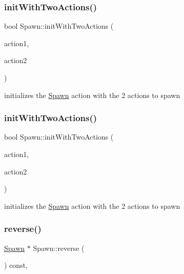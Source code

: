 \subsubsection{\texorpdfstring{init\+With\+Two\+Actions()}{initWithTwoActions()}\hspace{0.1cm}{\footnotesize\ttfamily [1/2]}}
{\footnotesize\ttfamily bool Spawn\+::init\+With\+Two\+Actions (\begin{DoxyParamCaption}\item[{\hyperlink{classFiniteTimeAction}{Finite\+Time\+Action} $\ast$}]{action1,  }\item[{\hyperlink{classFiniteTimeAction}{Finite\+Time\+Action} $\ast$}]{action2 }\end{DoxyParamCaption})}

initializes the \hyperlink{classSpawn}{Spawn} action with the 2 actions to spawn \mbox{\label{classSpawn_a7ca09352e8571699efd1582b0ad5ef45}} 
\subsubsection{\texorpdfstring{init\+With\+Two\+Actions()}{initWithTwoActions()}\hspace{0.1cm}{\footnotesize\ttfamily [2/2]}}
{\footnotesize\ttfamily bool Spawn\+::init\+With\+Two\+Actions (\begin{DoxyParamCaption}\item[{\hyperlink{classFiniteTimeAction}{Finite\+Time\+Action} $\ast$}]{action1,  }\item[{\hyperlink{classFiniteTimeAction}{Finite\+Time\+Action} $\ast$}]{action2 }\end{DoxyParamCaption})}

initializes the \hyperlink{classSpawn}{Spawn} action with the 2 actions to spawn \mbox{\label{classSpawn_a1000d2ebd49581fd3a9bb7adc74a1492}} 
\subsubsection{\texorpdfstring{reverse()}{reverse()}\hspace{0.1cm}{\footnotesize\ttfamily [1/2]}}
{\footnotesize\ttfamily \hyperlink{classSpawn}{Spawn} $\ast$ Spawn\+::reverse (\begin{DoxyParamCaption}\item[{void}]{ }\end{DoxyParamCaption}) const\hspace{0.3cm}{\ttfamily [override]}, {\ttfamily [virtual]}}

